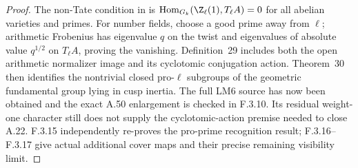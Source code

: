\begin{proof}
The non-Tate condition in \cite[Definition 26]{AuditStix2012} is $\operatorname{Hom}_{G_k}(\Z_\ell(1),T_\ell A)=0$ for all abelian varieties and primes. For number fields, choose a good prime away from $\ell$; arithmetic Frobenius has eigenvalue $q$ on the twist and eigenvalues of absolute value $q^{1/2}$ on $T_\ell A$, proving the vanishing. Definition~29 includes both the open arithmetic normalizer image and its cyclotomic conjugation action. Theorem~30 then identifies the nontrivial closed pro-$\ell$ subgroups of the geometric fundamental group lying in cusp inertia. The full LM6 source has now been obtained and the exact A.50 enlargement is checked in F.3.10. Its residual weight-one character still does not supply the cyclotomic-action premise needed to close A.22. F.3.15 independently re-proves the pro-prime recognition result; F.3.16--F.3.17 give actual additional cover maps and their precise remaining visibility limit.
\end{proof}

